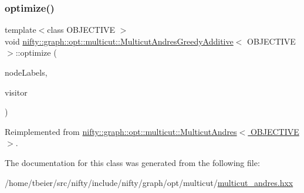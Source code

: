 \subsubsection{\texorpdfstring{optimize()}{optimize()}}
{\footnotesize\ttfamily template$<$class O\+B\+J\+E\+C\+T\+I\+VE $>$ \\
void \hyperlink{classnifty_1_1graph_1_1opt_1_1multicut_1_1MulticutAndresGreedyAdditive}{nifty\+::graph\+::opt\+::multicut\+::\+Multicut\+Andres\+Greedy\+Additive}$<$ O\+B\+J\+E\+C\+T\+I\+VE $>$\+::optimize (\begin{DoxyParamCaption}\item[{\hyperlink{classnifty_1_1graph_1_1opt_1_1multicut_1_1MulticutAndres_a6cd9d64abc4a98aa9745ce1ef0d4ecfe}{Node\+Labels\+Type} \&}]{node\+Labels,  }\item[{\hyperlink{classnifty_1_1graph_1_1opt_1_1multicut_1_1MulticutAndres_a295da342b6ebe8a8720cadd1dcce2e57}{Visitor\+Base\+Type} $\ast$}]{visitor }\end{DoxyParamCaption})\hspace{0.3cm}{\ttfamily [virtual]}}



Reimplemented from \hyperlink{classnifty_1_1graph_1_1opt_1_1multicut_1_1MulticutAndres_aa938eb1da7b3af5e0e5935e7bd818c61}{nifty\+::graph\+::opt\+::multicut\+::\+Multicut\+Andres$<$ O\+B\+J\+E\+C\+T\+I\+V\+E $>$}.



The documentation for this class was generated from the following file\+:\begin{DoxyCompactItemize}
\item 
/home/tbeier/src/nifty/include/nifty/graph/opt/multicut/\hyperlink{multicut__andres_8hxx}{multicut\+\_\+andres.\+hxx}\end{DoxyCompactItemize}
